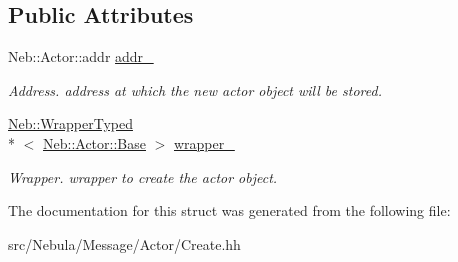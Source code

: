 \subsection*{Public Attributes}
\begin{DoxyCompactItemize}
\item 
\hypertarget{structNeb_1_1Message_1_1Actor_1_1Create_a925e9660c46a4264a84fdaad5dc79da8}{Neb\-::\-Actor\-::addr \hyperlink{structNeb_1_1Message_1_1Actor_1_1Create_a925e9660c46a4264a84fdaad5dc79da8}{addr\-\_\-}}\label{structNeb_1_1Message_1_1Actor_1_1Create_a925e9660c46a4264a84fdaad5dc79da8}

\begin{DoxyCompactList}\small\item\em Address. address at which the new actor object will be stored. \end{DoxyCompactList}\item 
\hypertarget{structNeb_1_1Message_1_1Actor_1_1Create_a6aae87ea763a64722094752017a9ba9b}{\hyperlink{classNeb_1_1WrapperTyped}{Neb\-::\-Wrapper\-Typed}\\*
$<$ \hyperlink{classNeb_1_1Actor_1_1Base}{Neb\-::\-Actor\-::\-Base} $>$ \hyperlink{structNeb_1_1Message_1_1Actor_1_1Create_a6aae87ea763a64722094752017a9ba9b}{wrapper\-\_\-}}\label{structNeb_1_1Message_1_1Actor_1_1Create_a6aae87ea763a64722094752017a9ba9b}

\begin{DoxyCompactList}\small\item\em Wrapper. wrapper to create the actor object. \end{DoxyCompactList}\end{DoxyCompactItemize}


The documentation for this struct was generated from the following file\-:\begin{DoxyCompactItemize}
\item 
src/\-Nebula/\-Message/\-Actor/Create.\-hh\end{DoxyCompactItemize}
